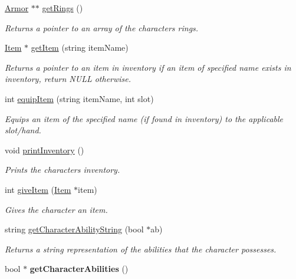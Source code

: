 \begin{DoxyCompactItemize}
\mbox{\hyperlink{class_armor}{Armor}} $\ast$$\ast$ \mbox{\hyperlink{class_character_ac75aeb066ce431010649333f3b8fae79}{get\+Rings}} ()
\begin{DoxyCompactList}\small\item\em Returns a pointer to an array of the character\textquotesingle{}s rings. \end{DoxyCompactList}\item 
\mbox{\hyperlink{class_item}{Item}} $\ast$ \mbox{\hyperlink{class_character_aff695a0c7cbea72f60fcaf37922bca29}{get\+Item}} (string item\+Name)
\begin{DoxyCompactList}\small\item\em Returns a pointer to an item in inventory if an item of specified name exists in inventory, return N\+U\+LL otherwise. \end{DoxyCompactList}\item 
int \mbox{\hyperlink{class_character_a4f453590cc77d43ee5c55eed246607b0}{equip\+Item}} (string item\+Name, int slot)
\begin{DoxyCompactList}\small\item\em Equips an item of the specified name (if found in inventory) to the applicable slot/hand. \end{DoxyCompactList}\item 
\mbox{\label{class_character_af00c9f919520e668d77208e615322dc6}} 
void \mbox{\hyperlink{class_character_af00c9f919520e668d77208e615322dc6}{print\+Inventory}} ()
\begin{DoxyCompactList}\small\item\em Prints the character\textquotesingle{}s inventory. \end{DoxyCompactList}\item 
int \mbox{\hyperlink{class_character_a88d219c54c93f65ead5a66545c7ebf87}{give\+Item}} (\mbox{\hyperlink{class_item}{Item}} $\ast$item)
\begin{DoxyCompactList}\small\item\em Gives the character an item. \end{DoxyCompactList}\item 
string \mbox{\hyperlink{class_character_ad1e769bb07c97c93de648fca312caef0}{get\+Character\+Ability\+String}} (bool $\ast$ab)
\begin{DoxyCompactList}\small\item\em Returns a string representation of the abilities that the character possesses. \end{DoxyCompactList}\item 
\mbox{\label{class_character_ab0da0c3b5d3125e233737685d84d20c2}} 
bool $\ast$ {\bfseries get\+Character\+Abilities} ()
\end{DoxyCompactItemize}


